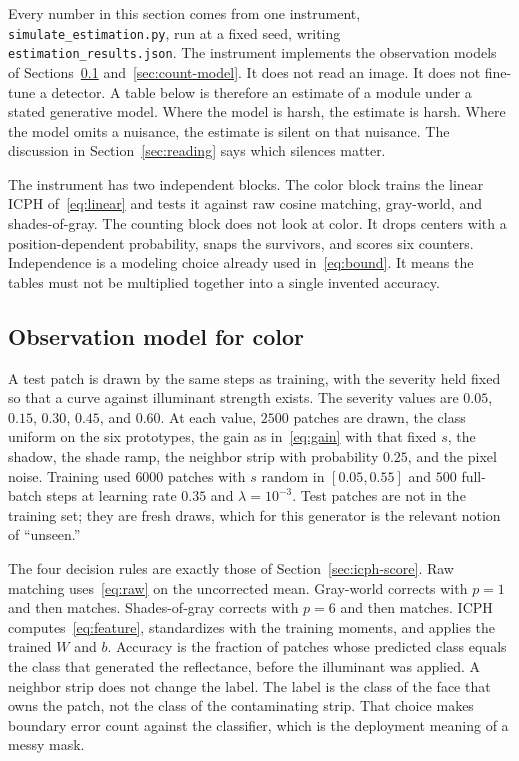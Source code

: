 Every number in this section comes from one instrument, \texttt{simulate\_estimation.py}, run at a fixed seed, writing \texttt{estimation\_results.json}. The instrument implements the observation models of Sections~\ref{sec:color-model} and~\ref{sec:count-model}. It does not read an image. It does not fine-tune a detector. A table below is therefore an estimate of a module under a stated generative model. Where the model is harsh, the estimate is harsh. Where the model omits a nuisance, the estimate is silent on that nuisance. The discussion in Section~\ref{sec:reading} says which silences matter.

The instrument has two independent blocks. The color block trains the linear ICPH of~\eqref{eq:linear} and tests it against raw cosine matching, gray-world, and shades-of-gray. The counting block does not look at color. It drops centers with a position-dependent probability, snaps the survivors, and scores six counters. Independence is a modeling choice already used in~\eqref{eq:bound}. It means the tables must not be multiplied together into a single invented accuracy.

\subsection{Observation model for color}
\label{sec:color-model}

A test patch is drawn by the same steps as training, with the severity held fixed so that a curve against illuminant strength exists. The severity values are $0.05$, $0.15$, $0.30$, $0.45$, and $0.60$. At each value, $2500$ patches are drawn, the class uniform on the six prototypes, the gain as in~\eqref{eq:gain} with that fixed $s$, the shadow, the shade ramp, the neighbor strip with probability $0.25$, and the pixel noise. Training used $6000$ patches with $s$ random in $[0.05,0.55]$ and $500$ full-batch steps at learning rate $0.35$ and $\lambda=10^{-3}$. Test patches are not in the training set; they are fresh draws, which for this generator is the relevant notion of ``unseen.''

The four decision rules are exactly those of Section~\ref{sec:icph-score}. Raw matching uses~\eqref{eq:raw} on the uncorrected mean. Gray-world corrects with $p=1$ and then matches. Shades-of-gray corrects with $p=6$ and then matches. ICPH computes~\eqref{eq:feature}, standardizes with the training moments, and applies the trained $W$ and $b$. Accuracy is the fraction of patches whose predicted class equals the class that generated the reflectance, before the illuminant was applied. A neighbor strip does not change the label. The label is the class of the face that owns the patch, not the class of the contaminating strip. That choice makes boundary error count against the classifier, which is the deployment meaning of a messy mask.

